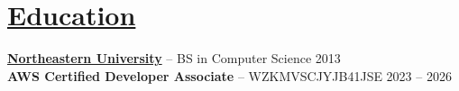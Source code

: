 \documentclass[10pt,letterpaper]{article}
\begin{document}
\section*{\href{https://www.reddit.com/r/EngineeringResumes/wiki/index\#wiki_education}{Education}}
\textbf{\href{https://www.northeastern.edu/}{Northeastern University}} -- BS in Computer Science \hfill 2013 \\
\textbf{AWS Certified Developer Associate} -- WZKMVSCJYJB41JSE \hfill 2023 -- 2026

\end{document}
